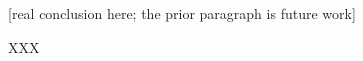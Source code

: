 \documentclass{sig-alternate-sigmod08}
\begin{document}
[real conclusion here; the prior paragraph is future work]


XXX\cite{bowman:reasoning}


%
%
\balancecolumns %
\end{document}
